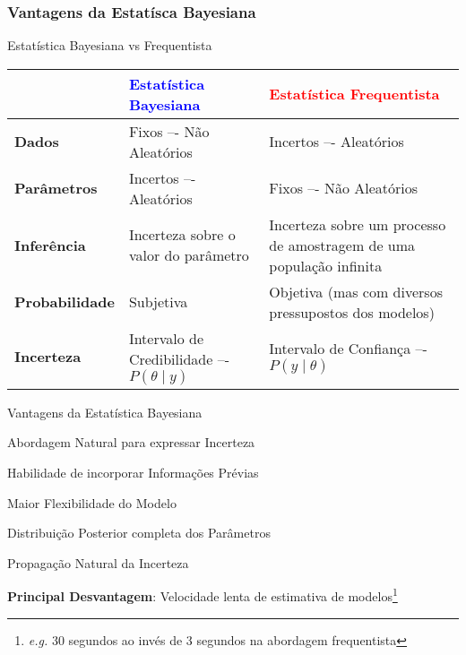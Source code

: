 \subsubsection{Vantagens da Estatísca Bayesiana}
\begin{frame}{Estatística Bayesiana vs Frequentista}
        \small
        \begin{tabular}{|l|p{}|p{}|}
        \toprule
                                & \textcolor{blue}{\textbf{Estatística Bayesiana}} & \textcolor{red}{\textbf{Estatística Frequentista}}                   \\ \midrule
        \textbf{Dados}          & Fixos –- Não Aleatórios                          & Incertos –- Aleatórios                                               \\ \midrule
        \textbf{Parâmetros}     & Incertos –- Aleatórios                           & Fixos –- Não Aleatórios                                              \\ \midrule
        \textbf{Inferência}     & Incerteza sobre o valor do parâmetro             & Incerteza sobre um processo de amostragem de uma população infinita  \\ \midrule
        \textbf{Probabilidade}  & Subjetiva                                        & Objetiva (mas com diversos pressupostos dos modelos)                 \\ \midrule
        \textbf{Incerteza}      & Intervalo de Credibilidade –- $P(\theta \mid y)$ & Intervalo de Confiança –- $P(y \mid \theta)$                         \\
        \bottomrule
        \end{tabular}
\end{frame}

\begin{frame}{Vantagens da Estatística Bayesiana}
    \begin{vfilleditems}
        \item Abordagem Natural para expressar Incerteza
        \item Habilidade de incorporar Informações Prévias
        \item Maior Flexibilidade do Modelo
        \item Distribuição Posterior completa dos Parâmetros
        \item Propagação Natural da Incerteza
    \end{vfilleditems}
    \small \textbf{Principal Desvantagem}: Velocidade lenta de estimativa de modelos\footnote{\textit{e.g.} 30 segundos ao invés de 3 segundos na abordagem frequentista}
\end{frame}

